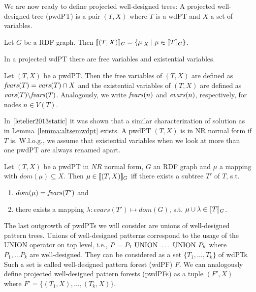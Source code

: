 We are now ready to define projected well-designed trees:
A projected well-designed tree (pwdPT) is a pair $(T,X)$ where $T$ is a wdPT and
$X$ a set of variables.
\begin{definition}
Let $G$ be a RDF graph. 
Then $\llbracket (T,X)\rrbracket_G = \{ \mu_{|X} \mid \mu \in \llbracket T \rrbracket_G\}$.
\end{definition}

In a projected wdPT there are free variables and existential variables.
\begin{definition}
	Let $(T,X)$ be a pwdPT. Then the free variables of $(T,X)$ are defined as
	$\mathit{fvars}(T)= \mathit{vars}(T) \cap X$ and
	the existential variables of $(T,X)$ are defined as $\mathit{vars}(T) \backslash
	\mathit{fvars}(T)$.
	Analogously, we write $\mathit{fvars}(n)$ and $\mathit{evars}(n)$, respectively, for nodes
	$n\in V(T)$.
\end{definition}

In $\cite{letelier2013static}$ it was shown that a 
similar characterization of solution as in Lemma~\ref{lemma:altsemwdpt} exists.
A pwdPT $(T,X)$ is in NR normal form if $T$ is. W.l.o.g., we assume that
existential variables when we look at more than one pwdPT are always renamed apart.

\begin{lemma}
	Let $(T,X)$ be a pwdPT in $NR$ normal form, $G$ an RDF graph and $\mu$ a
	mapping with $dom(\mu) \subseteq X$. Then $\mu \in \llbracket (T,X)\rrbracket_G$ iff
	there exists a subtree $T'$ of $T$, s.t. 
	\begin{enumerate}
		\item $dom(\mu) = \mathit{fvars}(T')$ and
		\item there exists a mapping $\lambda: evars(T') \mapsto dom(G)$, s.t.
			$\mu \cup \lambda \in \llbracket T \rrbracket_G$.

	\end{enumerate}
\end{lemma}

The last outgrowth of pwdPTs we will consider are unions of well-designed
pattern trees. Unions of well-designed patterns correspond to the usage of the
UNION operator on top level, i.e., $P = P_1 \mbox{ UNION } \dots \mbox{ UNION } P_k$ where
$P_1,\dots P_k$ are well-designed. They can be
considered as a set $\{T_1, \dots, T_k\}$ of wdPTs. Such a set is called
well-designed pattern forest (wdPF) $F$. We can analogously define projected
well-designed pattern forests (pwdPFs) as a tuple $(F',X)$ where $F'=\{(T_1,X),\dots,(T_k,X)\}$.

